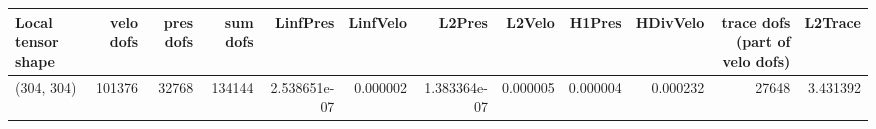 \begin{tabular}{lrrrrrrrrrrr}
\toprule
Local tensor shape &  velo dofs &  pres dofs &  sum dofs &     LinfPres &  LinfVelo &       L2Pres &   L2Velo &   H1Pres &  HDivVelo &  trace dofs (part of velo dofs) &  L2Trace \\
\midrule
        (304, 304) &     101376 &      32768 &    134144 & 2.538651e-07 &  0.000002 & 1.383364e-07 & 0.000005 & 0.000004 &  0.000232 &                           27648 & 3.431392 \\
\bottomrule
\end{tabular}
